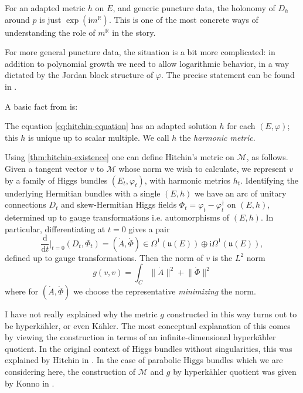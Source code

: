 \documentclass[12pt,letterpaper,reqno]{article}
\numberwithin{equation}{section}
\newcommand{\fu}{{\mathfrak u}}
\newcommand{\cM}{\ensuremath{\mathcal M}}
\newcommand{\R}{\ensuremath{\mathbb R}}
\newcommand{\kahler}{K\"ahler\xspace}
\newcommand{\hk}{hyperk\"ahler\xspace}
\newcommand{\Hk}{Hyperk\"ahler\xspace}
\newcommand{\I}{{\mathrm i}}
\newcommand{\de}{\mathrm{d}}
\newcommand{\norm}[1]{\lVert#1\rVert}
\newcommand{\ti}[1]{\textit{#1}}
\begin{document}
\begin{remark}
For an adapted metric $h$ on $E$, and generic puncture data, 
the holonomy of $D_h$ around $p$
is just $\exp(\I m^\R)$. This is one of the most concrete ways
of understanding the role of $m^\R$ in the story.
\end{remark}

For more general puncture data, the situation is a bit 
more complicated: in addition to polynomial growth
we need to allow logarithmic behavior, in a way dictated
by the Jordan block structure of $\varphi$.
The precise statement can be found in \cite{hbnc}.

A basic fact from \cite{hbnc} is:
\begin{thm} \label{thm:hitchin-existence}
The equation \eqref{eq:hitchin-equation} has an
adapted solution $h$ for each $(E,\varphi)$;
this $h$ is unique up to scalar multiple.
We call $h$ the \ti{harmonic metric}.
\end{thm}

Using \autoref{thm:hitchin-existence}
one can define Hitchin's metric on $\cM$, as follows.
Given a tangent vector $v$ to $\cM$ whose norm we wish to calculate, we represent $v$ by a family of Higgs bundles
$(E_t,\varphi_t)$, with harmonic metrics $h_t$.
Identifying the underlying Hermitian bundles with a single $(E,h)$
we have an arc of unitary connections $D_t$ and skew-Hermitian 
Higgs fields $\Phi_t = \varphi_t - \varphi_t^\dagger$ 
on $(E,h)$, determined up to gauge transformations i.e. 
automorphisms of $(E,h)$.
In particular, differentiating at $t = 0$ gives a pair
\begin{equation}
\frac{\de}{\de t}\Bigg\rvert_{t=0} (D_t, \Phi_t) = 
(\dot A, \dot \Phi) \in \Omega^1(\fu(E)) \oplus \I \Omega^{1}(\fu(E)),
\end{equation}
defined up to gauge transformations.
Then the norm of $v$ is the $L^2$ norm
\begin{equation}
  g(v,v) = \int_C \norm{\dot A}^2 + \norm{\dot \Phi}^2
\end{equation}
where for $(\dot A, \dot \Phi)$ we choose the representative
\ti{minimizing} the norm.

\begin{remark}[\Hk quotient] I have not really explained
why the metric $g$ constructed in this way turns out to 
be \hk, or even \kahler. The most conceptual explanation
of this comes by viewing the construction in terms of 
an infinite-dimensional \hk quotient.
In the original context of Higgs bundles without 
singularities, this was explained by
Hitchin in \cite{MR89a:32021}.
In the case of parabolic Higgs bundles which we
are considering here,
the construction of $\cM$ and $g$ by \hk quotient
was given by Konno in \cite{MR1206652}.

\end{remark}
\end{document}
